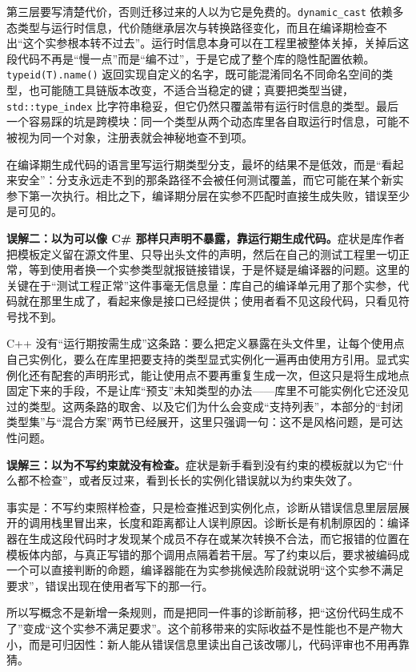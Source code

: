 \documentclass[12pt,a4paper,fontset=fandol]{ctexbook}
\newcommand{\kw}[1]{\texttt{#1}}
\begin{document}
第三层要写清楚代价，否则迁移过来的人以为它是免费的。\kw{dynamic\_cast} 依赖多态类型与运行时信息，代价随继承层次与转换路径变化，而且在编译期检查不出“这个实参根本转不过去”。运行时信息本身可以在工程里被整体关掉，关掉后这段代码不再是“慢一点”而是“编不过”，于是它成了整个库的隐性配置依赖。\kw{typeid(T).name()} 返回实现自定义的名字，既可能混淆同名不同命名空间的类型，也可能随工具链版本改变，不适合当稳定的键；真要把类型当键，\kw{std::type\_index}\allowbreak{} 比字符串稳妥，但它仍然只覆盖带有运行时信息的类型。最后一个容易踩的坑是跨模块：同一个类型从两个动态库里各自取运行时信息，可能不被视为同一个对象，注册表就会神秘地查不到项。

\begin{warning}[title={别把运行期分派塞进模板体}]
在编译期生成代码的语言里写运行期类型分支，最坏的结果不是低效，而是“看起来安全”：分支永远走不到的那条路径不会被任何测试覆盖，而它可能在某个新实参下第一次执行。相比之下，编译期分层在实参不匹配时直接生成失败，错误至少是可见的。
\end{warning}

\textbf{误解二：以为可以像 C\# 那样只声明不暴露，靠运行期生成代码。}症状是库作者把模板定义留在源文件里、只导出头文件的声明，然后在自己的测试工程里一切正常，等到使用者换一个实参类型就报链接错误，于是怀疑是编译器的问题。这里的关键在于“测试工程正常”这件事毫无信息量：库自己的编译单元用了那个实参，代码就在那里生成了，看起来像是接口已经提供；使用者看不见这段代码，只看见符号找不到。

C++ 没有“运行期按需生成”这条路：要么把定义暴露在头文件里，让每个使用点自己实例化，要么在库里把要支持的类型显式实例化一遍再由使用方引用。显式实例化还有配套的声明形式，能让使用点不要再重复生成一次，但这只是将生成地点固定下来的手段，不是让库“预支”未知类型的办法——库里不可能实例化它还没见过的类型。这两条路的取舍、以及它们为什么会变成“支持列表”，本部分的“封闭类型集”与“混合方案”两节已经展开，这里只强调一句：这不是风格问题，是可达性问题。

\textbf{误解三：以为不写约束就没有检查。}症状是新手看到没有约束的模板就以为它“什么都不检查”，或者反过来，看到长长的实例化错误就以为约束失效了。

事实是：不写约束照样检查，只是检查推迟到实例化点，诊断从错误信息里层层展开的调用栈里冒出来，长度和距离都让人误判原因。诊断长是有机制原因的：编译器在生成这段代码时才发现某个成员不存在或某次转换不合法，而它报错的位置在模板体内部，与真正写错的那个调用点隔着若干层。写了约束以后，要求被编码成一个可以直接判断的命题，编译器能在为实参挑候选阶段就说明“这个实参不满足要求”，错误出现在使用者写下的那一行。

所以写概念不是新增一条规则，而是把同一件事的诊断前移，把“这份代码生成不了”变成“这个实参不满足要求”。这个前移带来的实际收益不是性能也不是产物大小，而是可归因性：新人能从错误信息里读出自己该改哪儿，代码评审也不用再靠猜。
\end{document}
